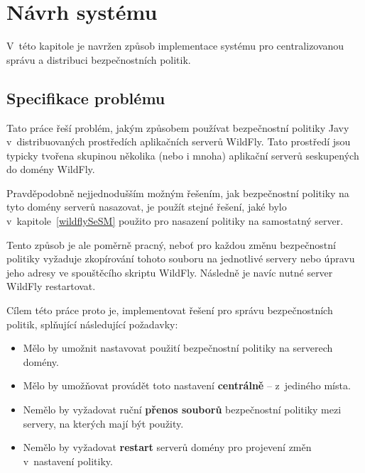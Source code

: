 \chapter{Návrh systému} \label{navrh}

V~této kapitole je navržen způsob implementace systému pro centralizovanou správu a distribuci bezpečnostních politik.

\section{Specifikace problému} \label{specifikaceProblemu}

Tato práce řeší problém, jakým způsobem používat bezpečnostní politiky Javy v~distribuovaných prostředích aplikačních serverů WildFly.
Tato prostředí jsou typicky tvořena skupinou několika (nebo i mnoha) aplikační serverů seskupených do domény WildFly.

Pravděpodobně nejjednodušším možným řešením, jak bezpečnostní politiky na tyto domény serverů nasazovat, je použít stejné řešení, jaké bylo v~kapitole~\ref{wildflySeSM} použito pro nasazení politiky na samostatný server.

Tento způsob je ale poměrně pracný, neboť pro každou změnu bezpečnostní politiky vyžaduje zkopírování tohoto souboru na jednotlivé servery nebo úpravu jeho adresy ve spouštěcího skriptu WildFly. Následně je navíc nutné server WildFly restartovat.

Cílem této práce proto je, implementovat řešení pro správu bezpečnostních politik, splňující následující požadavky:

\begin{itemize}
  \item Mělo by umožnit nastavovat použití bezpečnostní politiky na serverech domény.
  \item Mělo by umožňovat provádět toto nastavení {\bf centrálně} -- z~jediného místa.
  \item Nemělo by vyžadovat ruční {\bf přenos souborů} bezpečnostní politiky mezi servery, na kterých mají být použity.
  \item Nemělo by vyžadovat {\bf restart} serverů domény pro projevení změn v~nastavení politiky.
\end{itemize}

